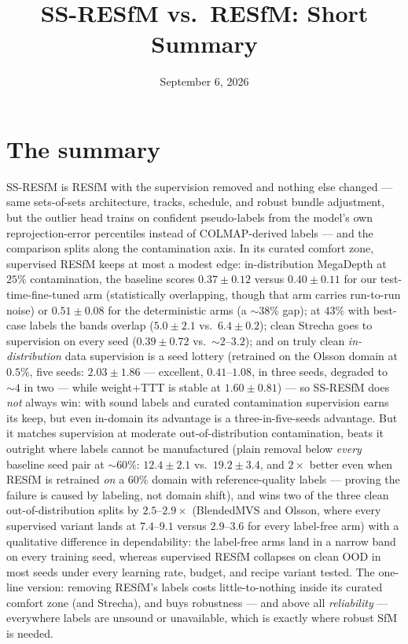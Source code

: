 \documentclass[11pt]{article}
\title{SS-RESfM vs.\ RESfM: Short Summary}
\author{}
\date{September 6, 2026}
\begin{document}
\maketitle
\vspace{-2.5em}

\section*{The summary}

SS-RESfM is RESfM with the supervision removed and nothing else changed --- same
sets-of-sets architecture, tracks, schedule, and robust bundle adjustment, but the
outlier head trains on confident pseudo-labels from the model's own reprojection-error
percentiles instead of COLMAP-derived labels --- and the comparison splits along the
contamination axis. In its curated comfort zone, supervised RESfM keeps at most a modest
edge: in-distribution MegaDepth at $25\%$ contamination, the baseline scores
$0.37\pm0.12$ versus $0.40\pm0.11$ for our test-time-fine-tuned arm (statistically
overlapping, though that arm carries run-to-run noise) or $0.51\pm0.08$ for the
deterministic arms (a ${\sim}38\%$ gap); at $43\%$ with best-case labels the bands
overlap ($5.0\pm2.1$ vs.\ $6.4\pm0.2$); clean Strecha goes to supervision on every
seed ($0.39\pm0.72$ vs.\ ${\sim}2$--$3.2$); and on truly clean \emph{in-distribution} data supervision is a seed lottery
(retrained on the Olsson domain at $0.5\%$, five seeds: $2.03\pm1.86$ --- excellent,
$0.41$--$1.08$, in three seeds, degraded to ${\sim}4$ in two --- while weight+TTT is
stable at $1.60\pm0.81$) --- so SS-RESfM does \emph{not} always win: with sound labels
and curated contamination supervision earns its keep, but even in-domain its advantage
is a three-in-five-seeds advantage.
But it matches supervision at moderate out-of-distribution contamination, beats it
outright where labels cannot be manufactured (plain removal below \emph{every} baseline
seed pair at ${\sim}60\%$: $12.4\pm2.1$ vs.\ $19.2\pm3.4$, and $2\times$ better even
when RESfM is retrained \emph{on} a $60\%$ domain with reference-quality labels ---
proving the failure is caused by labeling, not domain shift), and wins two of the three
clean out-of-distribution splits by $2.5$--$2.9\times$ (BlendedMVS and Olsson, where
every supervised variant lands at $7.4$--$9.1$ versus $2.9$--$3.6$ for every label-free
arm) with a qualitative difference in dependability: the label-free arms land in a
narrow band on every training seed, whereas supervised RESfM collapses on clean OOD in
most seeds under every learning rate, budget, and recipe variant tested. The one-line
version: removing RESfM's labels costs little-to-nothing inside its curated comfort zone
(and Strecha), and buys robustness --- and above all \emph{reliability} --- everywhere
labels are unsound or unavailable, which is exactly where robust SfM is needed.
\end{document}
